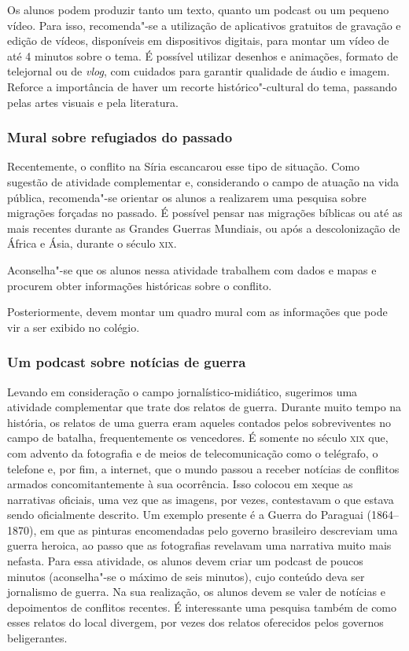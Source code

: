 \documentclass[12pt]{extarticle}
\begin{document}
Os alunos podem produzir tanto um texto, quanto um podcast ou um pequeno vídeo.
Para isso, recomenda"-se a utilização de aplicativos gratuitos de
gravação e edição de vídeos, disponíveis em dispositivos digitais,
para montar um vídeo de até 4 minutos sobre o tema. É possível
utilizar desenhos e animações, formato de telejornal ou de
\emph{vlog}, com cuidados para garantir qualidade de áudio e imagem.
Reforce a importância de haver um recorte histórico"-cultural do tema,
passando pelas artes visuais e pela literatura.


\subsubsection{Mural sobre refugiados do passado}

Recentemente, o conflito na Síria escancarou esse tipo de situação.
Como sugestão de atividade complementar e, considerando
o campo de atuação na vida pública, recomenda"-se orientar os 
alunos a realizarem uma pesquisa sobre
migrações forçadas no passado. É possível pensar nas migrações bíblicas ou 
até as mais recentes durante as Grandes Guerras Mundiais, ou 
após a descolonização de África e Ásia, durante o século \textsc{xix}.

Aconselha"-se que os alunos nessa atividade trabalhem com dados e mapas
e procurem obter informações históricas sobre o conflito.

Posteriormente, devem montar um quadro mural com as informações que
pode vir a ser exibido no colégio.

\subsubsection{Um podcast sobre notícias de guerra}

Levando em consideração o campo jornalístico-midiático, sugerimos
uma atividade complementar que trate dos relatos de guerra.
Durante muito tempo na história, os relatos de uma guerra eram aqueles
contados pelos sobreviventes no campo de batalha, frequentemente os
vencedores. É somente no século \textsc{xix} que, com advento da fotografia e
de meios de telecomunicação como o telégrafo, o telefone e, por fim, a
internet, que o mundo passou a receber notícias de conflitos armados
concomitantemente à sua ocorrência. Isso colocou em xeque as
narrativas oficiais, uma vez que as imagens, por vezes, contestavam o
que estava sendo oficialmente descrito. Um exemplo presente é a Guerra
do Paraguai (1864--1870), em que as pinturas encomendadas pelo governo
brasileiro descreviam uma guerra heroica, ao passo que as fotografias
revelavam uma narrativa muito mais nefasta. Para essa atividade, os
alunos devem criar um podcast de poucos minutos (aconselha"-se o máximo
de seis minutos), cujo conteúdo deva ser jornalismo de guerra. Na sua
realização, os alunos devem se valer de notícias e depoimentos de
conflitos recentes. É interessante uma pesquisa também de como esses
relatos do local divergem, por vezes dos relatos oferecidos pelos
governos beligerantes.
\end{document}
